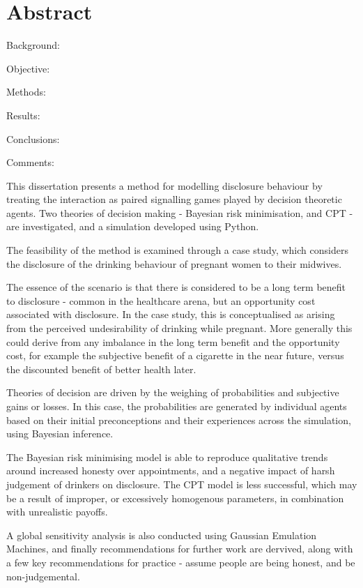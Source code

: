 \begingroup
\let\clearpage\relax
\let\cleardoublepage\relax



\section*{Abstract}

Background: 

Objective: 

Methods: 

Results: 

Conclusions:

Comments: 

This dissertation presents a method for modelling disclosure behaviour
by treating the interaction as paired signalling games played by decision
theoretic agents. Two theories of decision making - Bayesian risk
minimisation, and \ac{CPT} - are investigated, and a simulation developed
using Python.

The feasibility of the method is examined through a case study, which
considers the disclosure of the drinking behaviour of pregnant women
to their midwives. 

The essence of the scenario is that there is considered to be a long
term benefit to disclosure - common in the healthcare arena, but an
opportunity cost associated with disclosure. In the case study, this
is conceptualised as arising from the perceived undesirability of
drinking while pregnant. More generally this could derive from any
imbalance in the long term benefit and the opportunity cost, for example
the subjective benefit of a cigarette in the near future, versus the
discounted benefit of better health later.

Theories of decision are driven by the weighing of probabilities and
subjective gains or losses. In this case, the probabilities are generated
by individual agents based on their initial preconceptions and their
experiences across the simulation, using Bayesian inference.

The Bayesian risk minimising model is able to reproduce qualitative
trends around increased honesty over appointments, and a negative
impact of harsh judgement of drinkers on disclosure. The \ac{CPT}
model is less successful, which may be a result of improper, or excessively
homogenous parameters, in combination with unrealistic payoffs.

A global sensitivity analysis is also conducted using Gaussian Emulation
Machines, and finally recommendations for further work are dervived, along
with a few key recommendations for practice - assume people are being honest,
and be non-judgemental.

\vfill{}


\endgroup

